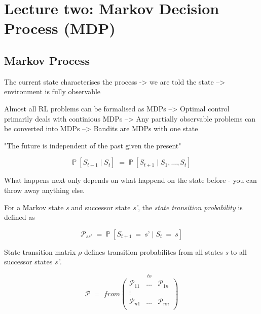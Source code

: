 \documentclass[10pt]{article}
\begin{document}
\section{Lecture two: Markov Decision Process (MDP)}
\subsection{Markov Process}

The current state characterises the process -> we are told the state --> environment is fully observable\newline

Almost all RL problems can be formalised as MDPs\newline
--> Optimal control primarily deals with continious MDPs\newline
--> Any partially observable problems can be converted into MDPs\newline
--> Bandits are MDPs with one state\newline

"The future is independent of the past given the present"

\begin{equation}
	\mathbb{P} \: [S_{t+1}\; | \; S_{t}] \; = \; \mathbb{P} \: [S_{t+1} \; | \; S_{1}, \ldots , S_{t}]
\end{equation}


What happens next only depends on what happend on the state before - you can throw away anything else.\newline

For a Markov state \textit{s} and successor state \textit{s'}, the \textit{state transition probability} is defined as

\begin{equation}
\mathcal{P}_{ss'} \; = \; \mathbb{P}\:[S_{t+1}\:=\:\textit{s'}\; | \; S_{t}\:=\:\textit{s}]
\end{equation}

State transition matrix $\rho$ defines transition probabilites from all states \textit{s} to all successor states \textit{s'}.

\begin{equation}
\mathcal{P} \; = \; from 
\stackrel{\mbox{$to$}}{\begin{pmatrix}
\mathcal{P}_{11} & \ldots & \mathcal{P}_{1n} \\
\vdots & & \\
\mathcal{P}_{n1} & \ldots & \mathcal{P}_{nn} \\
\end{pmatrix}}
\end{equation}
\end{document}
